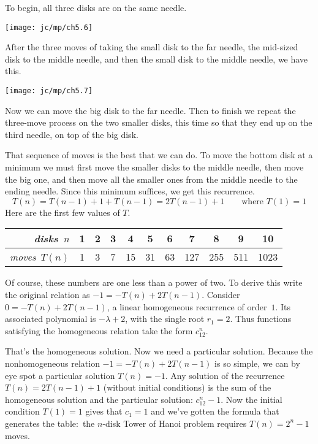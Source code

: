 To begin, all three disks are on the same needle.
\begin{center}
  \texttt{[image: jc/mp/ch5.6]}
\end{center}
After the three moves of taking the small disk to the far needle, 
the mid-sized disk to the
middle needle, and then the small disk to the middle needle,
we have this. 
\begin{center}
  \texttt{[image: jc/mp/ch5.7]}
\end{center}
Now we can  move the big disk to the far needle.
Then to finish we repeat the three-move process on the two smaller 
disks, this time so that they end up on the third needle, 
on top of the big disk.

That sequence of moves is the best that we can do.
To move the bottom disk
at a minimum we must first move the smaller disks to the middle needle, 
then move the big one,
and then move all the smaller ones from the middle needle 
to the ending needle. 
Since this minimum suffices, we get this recurrence.
\begin{equation*}
  T(n)=T(n-1)+1+T(n-1)=2T(n-1)+1 \qquad \text{where $T(1)=1$}
\end{equation*} 
Here are the first few values of $T$.
\begin{center}
  \begin{tabular}{r|cccccccccc}
    \textit{disks}~$n$             
       &1  &2  &3  &4  &5  &6     &7    &8    &9   &10  \\
    \hline
    \textit{moves}~$T(n)$ 
       &1  &3  &7  &15  &31  &63  &127  &255  &511 &1023 
  \end{tabular}
\end{center}
Of course, these numbers are one less than a power of two.
To derive this 
write the original relation as $-1=-T(n)+2T(n-1)$.
Consider $0=-T(n)+2T(n-1)$, a linear homogeneous recurrence of order~$1$. 
Its associated polynomial is $-\lambda+2$, 
with the single root $r_1=2$.
Thus
functions satisfying the homogeneous relation take the form $c_12^n$.

That's the homogeneous solution.
Now we need a particular solution. 
Because the nonhomogeneous relation $-1=-T(n)+2T(n-1)$ is so simple, 
we can by eye spot a particular solution $T(n)=-1$.
Any solution of the recurrence 
$T(n)=2T(n-1)+1$ (without initial conditions)
is the sum of the homogeneous solution and the
particular solution: $c_12^n-1$.
Now the initial condition $T(1)=1$ gives that $c_1=1$ and we've gotten
the formula that generates the table:~the $n$-disk Tower of Hanoi problem 
requires $T(n)=2^n-1$ moves.

